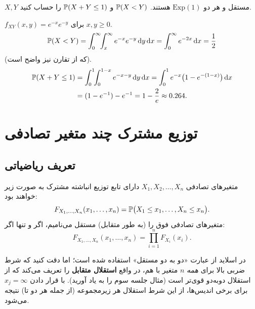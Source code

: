 \begin{center}
\end{center}

\begin{example}
$X,Y$ مستقل و هر دو $\mathrm{Exp}(1)$ هستند. $\mathbb{P}(X<Y)$ و $\mathbb{P}(X+Y\le1)$ را حساب کنید.
\begin{solution}
$f_{XY}(x,y)=e^{-x}e^{-y}$ برای $x,y\ge0$.
\[
\mathbb{P}(X<Y)=\int_0^\infty\!\!\int_x^\infty e^{-x}e^{-y}\,\mathrm{d} y\,\mathrm{d} x=\int_0^\infty e^{-2x}\,\mathrm{d} x=\frac12
\]
(که از تقارن نیز واضح است).
\[
\begin{aligned}
\mathbb{P}(X+Y\le1)&=\int_0^1\!\!\int_0^{1-x}e^{-x-y}\,\mathrm{d} y\,\mathrm{d} x=\int_0^1e^{-x}\big(1-e^{-(1-x)}\big)\,\mathrm{d} x\\
&=(1-e^{-1})-e^{-1}=1-\frac2e\approx0.264 .
\end{aligned}
\]
\end{solution}
\end{example}

\section{توزیع مشترک چند متغیر تصادفی}

\subsection{تعریف ریاضیاتی}
\begin{definition}
متغیرهای تصادفی $X_1,X_2,\ldots,X_n$ دارای تابع توزیع انباشته مشترک به صورت زیر خواهند بود:
\[
F_{X_1,\ldots,X_n}(x_1,\ldots,x_n)=\mathbb{P}\big(X_1\le x_1,\ldots,X_n\le x_n\big).
\]
متغیرهای تصادفی فوق را (به طور متقابل) مستقل می‌نامیم، اگر و تنها اگر:
\[
F_{X_1,\ldots,X_n}(x_1,\ldots,x_n)=\prod_{i=1}^{n}F_{X_i}(x_i).
\]
\end{definition}
\begin{note}
\notetitle در اسلاید از عبارت «دو به دو مستقل» استفاده شده است؛ اما دقت کنید که شرط ضربی بالا برای \emph{همه} $n$ متغیر با هم، در واقع \textbf{استقلال متقابل} را تعریف می‌کند که از استقلال دوبه‌دو قوی‌تر است (مثال جلسه سوم را به یاد آورید). با قرار دادن $x_j=\infty$ برای برخی اندیس‌ها، از این شرط استقلال هر زیرمجموعه (از جمله هر دو تا) نتیجه می‌شود.
\end{note}


